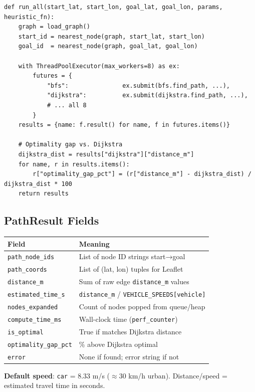 \documentclass[11pt,a4paper]{article}
\begin{document}
\begin{lstlisting}[caption={src/algorithms/runner.py — parallel dispatch}]
def run_all(start_lat, start_lon, goal_lat, goal_lon, params, heuristic_fn):
    graph = load_graph()
    start_id = nearest_node(graph, start_lat, start_lon)
    goal_id  = nearest_node(graph, goal_lat, goal_lon)

    with ThreadPoolExecutor(max_workers=8) as ex:
        futures = {
            "bfs":               ex.submit(bfs.find_path, ...),
            "dijkstra":          ex.submit(dijkstra.find_path, ...),
            # ... all 8
        }
    results = {name: f.result() for name, f in futures.items()}

    # Optimality gap vs. Dijkstra
    dijkstra_dist = results["dijkstra"]["distance_m"]
    for name, r in results.items():
        r["optimality_gap_pct"] = (r["distance_m"] - dijkstra_dist) / dijkstra_dist * 100
    return results
\end{lstlisting}

\subsection{PathResult Fields}
\begin{table}[H]
\centering\small
\begin{tabular}{ll}
\toprule
\textbf{Field} & \textbf{Meaning} \\
\midrule
\texttt{path\_node\_ids} & List of node ID strings start→goal \\
\texttt{path\_coords} & List of (lat, lon) tuples for Leaflet \\
\texttt{distance\_m} & Sum of raw edge \texttt{distance\_m} values \\
\texttt{estimated\_time\_s} & \texttt{distance\_m} / \texttt{VEHICLE\_SPEEDS[vehicle]} \\
\texttt{nodes\_expanded} & Count of nodes popped from queue/heap \\
\texttt{compute\_time\_ms} & Wall-clock time (\texttt{perf\_counter}) \\
\texttt{is\_optimal} & True if matches Dijkstra distance \\
\texttt{optimality\_gap\_pct} & \% above Dijkstra optimal \\
\texttt{error} & None if found; error string if not \\
\bottomrule
\end{tabular}
\end{table}

\textbf{Default speed}: \texttt{car} = 8.33 m/s ($\approx$30 km/h urban). Distance/speed = estimated travel time in seconds.
\end{document}
